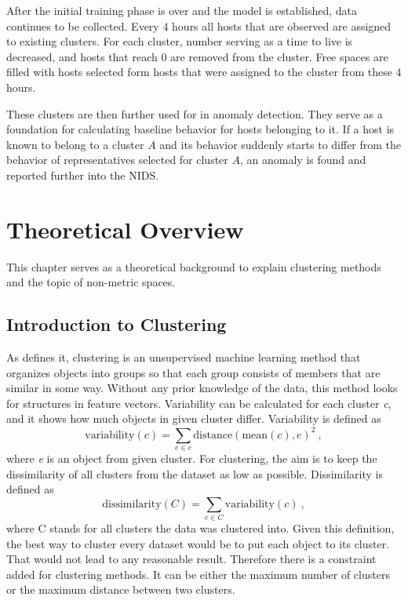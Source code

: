 \documentclass[thesis=B,english]{FITthesis}[2012/10/20]
\begin{document}
After the initial training phase is over and the model is established, data continues to be collected.
Every 4 hours all hosts that are observed are assigned to existing clusters.
For each cluster, number serving as a time to live is decreased, and hosts that reach 0 are removed from the cluster.
Free spaces are filled with hosts selected form hosts that were assigned to the cluster from these 4 hours.

These clusters are then further used for in anomaly detection.
They serve as a foundation for calculating baseline behavior for hosts belonging to it.
If a host is known to belong to a cluster $A$ and its behavior suddenly starts to differ from the behavior of representatives selected for cluster $A$, an anomaly is found and reported further into the NIDS.


\chapter{Theoretical Overview}

This chapter serves as a theoretical background to explain clustering methods and the topic of non-metric spaces.

\section{Introduction to Clustering}\label{sec:clust_intro}
As \cite{guttag2016introduction} defines it, clustering is an unsupervised machine learning method that organizes objects into groups so that each group consists of members that are similar in some way.
Without any prior knowledge of the data, this method looks for structures in feature vectors.
Variability can be calculated for each cluster \textit{c}, and it shows how much objects in given cluster differ.
Variability is defined as $$ \mathrm{variability}(c) = \sum_{e \in c} \mathrm{distance}(\mathrm{mean}(c), e)^2\:,$$ where \textit{e} is an object from given cluster.
For clustering, the aim is to keep the dissimilarity of all clusters from the dataset as low as possible.
Dissimilarity is defined as $$ \mathrm{dissimilarity}(C) = \sum_{c \in C} \mathrm{variability}(c)\:,$$ where C stands for all clusters the data was clustered into.
Given this definition, the best way to cluster every dataset would be to put each object to its cluster.
That would not lead to any reasonable result.
Therefore there is a constraint added for clustering methods.
It can be either the maximum number of clusters or the maximum distance between two clusters. \\
\end{document}
